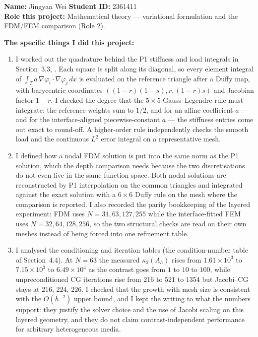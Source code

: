 \begin{formbox}
\textbf{Name:} Jingyan Wei \hfill \textbf{Student ID:} 2361411\\
\textbf{Role this project:} Mathematical theory --- variational formulation
and the FDM/FEM comparison (Role 2).

\textbf{The specific things I did this project:}
\begin{enumerate}[leftmargin=2em,itemsep=0.25em,topsep=0.15em]
    \item I worked out the quadrature behind the P1 stiffness and load
    integrals in Section~3.3, .
    Each square is split along its diagonal, so every element integral of
    $\int_T a\,\nabla\varphi_i\cdot\nabla\varphi_j\,dx$ is evaluated on the
    reference triangle after a Duffy map, with barycentric coordinates
    $((1-r)(1-s),r,(1-r)s)$ and Jacobian factor $1-r$. I checked the degree
    that the $5\times5$ Gauss--Legendre rule must integrate: the reference
    weights sum to $1/2$, and for an affine coefficient $a$ --- and for the
    interface-aligned piecewise-constant $a$ --- the stiffness entries come
    out exact to round-off. A higher-order rule independently checks the
    smooth load and the continuous $L^2$ error integral on a representative
    mesh.

    \item I defined how a nodal FDM solution is put into the same norm as the
    P1 solution, which the depth comparison needs because the two
    discretisations do not even live in the same function space. Both nodal
    solutions are reconstructed by P1 interpolation on the common triangles
    and integrated against the exact solution with a $6\times6$ Duffy rule
    on the mesh where the comparison is reported. I also recorded the parity
    bookkeeping of the layered experiment: FDM uses $N=31,63,127,255$ while
    the interface-fitted FEM uses $N=32,64,128,256$, so the two structural
    checks are read on their own meshes instead of being forced into one
    refinement table.

    \item I analysed the conditioning and iteration tables
    (the condition-number table of Section~4.4). At $N=63$ the
    measured $\kappa_2(A_h)$ rises from $1.61\times10^3$ to
    $7.15\times10^3$ to $6.49\times10^4$ as the contrast goes from $1$ to
    $10$ to $100$, while unpreconditioned CG iterations rise from $216$ to
    $521$ to $1354$ but Jacobi--CG stays at $216$, $224$, $226$. I checked
    that the growth with mesh size is consistent with the $O(h^{-2})$ upper
    bound, and I kept the writing to what the numbers support: they justify
    the solver choice and the use of Jacobi scaling on this layered geometry,
    and they do not claim contrast-independent performance for arbitrary
    heterogeneous media.
\end{enumerate}


\end{formbox}
